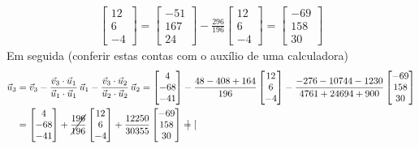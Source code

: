 \documentclass[../livro.tex]{subfiles}  %
\begin{document}
\begin{example}
\begin{align*}
\begin{bmatrix}
12 \\
6 \\
-4
\end{bmatrix} =
\begin{bmatrix}
 -51  \\
 167  \\
 24
\end{bmatrix} - \frac{296}{196}
\begin{bmatrix}
12 \\
6 \\
-4
\end{bmatrix} =
\begin{bmatrix}
 -69  \\
 158  \\
 30
\end{bmatrix}
  \end{align*}
 Em seguida (conferir estas contas com o auxílio de uma calculadora)
  \begin{align*}
\vec{u}_3 & = \vec{v}_3 - \frac{\vec{v}_3 \cdot \vec{u}_1}{\vec{u}_1 \cdot \vec{u}_1} \, \vec{u}_1 - \frac{\vec{v}_3 \cdot \vec{u}_2}{\vec{u}_2 \cdot \vec{u}_2} \, \vec{u}_2 = \begin{bmatrix}
  4 \\
 -68 \\
 -41
\end{bmatrix} - \frac{48-408 + 164}{196}
\begin{bmatrix}
12 \\
6 \\
-4
\end{bmatrix} - \frac{-276 - 10744 - 1230}{4761 + 24694 + 900}
\begin{bmatrix}
 -69  \\
 158  \\
 30
\end{bmatrix} \\
   & = \begin{bmatrix}
  4 \\
 -68 \\
 -41
\end{bmatrix} + \cancel{\frac{196}{196}}
\begin{bmatrix}
12 \\
6 \\
-4
\end{bmatrix} + \frac{12250}{30355}
\begin{bmatrix}
 -69  \\
 158  \\
 30
\end{bmatrix} = \begin{bmatrix}

\end{bmatrix}
\end{align*}
\end{example}
\end{document}
